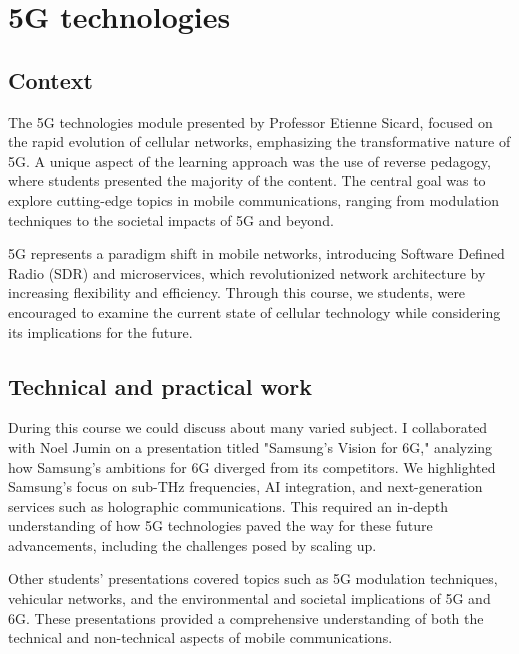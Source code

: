 \section{5G technologies}
\subsection{Context}

\indent \indent The 5G technologies module presented by Professor Etienne Sicard, focused on the rapid evolution of cellular networks, emphasizing the transformative nature of 5G. A unique aspect of the learning approach was the use of reverse pedagogy, where students presented the majority of the content. The central goal was to explore cutting-edge topics in mobile communications, ranging from modulation techniques to the societal impacts of 5G and beyond.
\vspace{0.25cm}

\noindent 5G represents a paradigm shift in mobile networks, introducing Software Defined Radio (SDR) and microservices, which revolutionized network architecture by increasing flexibility and efficiency. Through this course, we students, were encouraged to examine the current state of cellular technology while considering its implications for the future.

\subsection{Technical and practical work}

\indent \indent During this course we could discuss about many varied subject. I collaborated with Noel Jumin on a presentation titled "Samsung's Vision for 6G," analyzing how Samsung's ambitions for 6G diverged from its competitors. We highlighted Samsung's focus on sub-THz frequencies, AI integration, and next-generation services such as holographic communications. This required an in-depth understanding of how 5G technologies paved the way for these future advancements, including the challenges posed by scaling up.
\vspace{0.25cm}

\noindent Other students' presentations covered topics such as 5G modulation techniques, vehicular networks, and the environmental and societal implications of 5G and 6G. These presentations provided a comprehensive understanding of both the technical and non-technical aspects of mobile communications.

